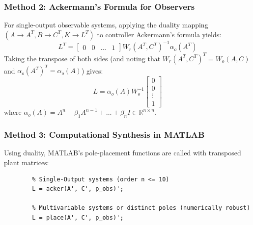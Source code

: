 \documentclass[12pt,onecolumn,twoside ]{article}
\begin{document}
	\subsubsection{Method 2: Ackermann’s Formula for Observers}
	For single-output observable systems, applying the duality mapping $(A \to A^T, B \to C^T, K \to L^T)$ to controller Ackermann's formula yields: \[
	L^T = \begin{bmatrix} 0 & 0 & \dots & 1 \end{bmatrix} W_r(A^T, C^T)^{-1} \alpha_o(A^T)
	\]
	Taking the transpose of both sides (and noting that $W_r(A^T, C^T)^T = W_o(A, C)$ and $\alpha_o(A^T)^T = \alpha_o(A)$) gives: \[
	L = \alpha_o(A) W_o^{-1} \begin{bmatrix} 0 \\ 0 \\ \vdots \\ 1 \end{bmatrix}
	\] where $\alpha_o(A) = A^n + \beta_1 A^{n-1} + \dots + \beta_n I \in \mathbb{R}^{n \times n}$.
	
	\subsubsection{Method 3: Computational Synthesis in MATLAB}
	Using duality, MATLAB's pole-placement functions are called with transposed plant matrices:
	\begin{lstlisting}
		% Single-Output systems (order n <= 10)
		L = acker(A', C', p_obs)';
		
		% Multivariable systems or distinct poles (numerically robust)
		L = place(A', C', p_obs)';
	\end{lstlisting}
	
\end{document}
